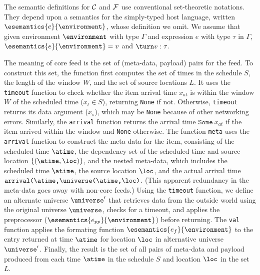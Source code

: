 
The semantic definitions for ${\cal C}$ and ${\cal F}$ use
conventional set-theoretic notations.  They depend upon a
semantics for the simply-typed host language, written
$\esemantics{e}{\environment}$, whose definition we omit. We assume
that given environment $\environment$ with type $\Gamma$ and
expression $e$ with type $\tau$ in $\Gamma$,
$\esemantics{e}{\environment} = v$ and $\turn v : \tau$.

The meaning of core feed \corefeed{} is the set of
(meta-data, payload) pairs for the feed.  To construct this set, the
function first computes the set of times in the schedule $S$, the
length of the window $W$, and the set of source locations $L$.  It
uses the \texttt{timeout} function to check whether the item arrival time
$x_{at}$ is within the window $W$
of the scheduled time ($x_t \in S$), returning \texttt{None} if
not. Otherwise, \texttt{timeout} returns its data argument ($x_s$),
which may be {\tt None} because of other networking errors.  
Similarly, the \texttt{arrival} function returns the arrival time
$\texttt{Some}\ x_{at}$ if the item arrived within the window and 
\texttt{None} otherwise. The function \texttt{meta} uses the 
\texttt{arrival} function to construct the meta-data for the item,
consisting of the scheduled time $\atime$, the dependency set of the scheduled
time and  source location $\{(\atime, \loc)\}$, and the nested
meta-data, which includes the scheduled 
time $\atime$, the source location $\loc$, and the actual arrival time
$\texttt{arrival(\atime,\universe(\atime,\loc)}$. (This apparent
redundancy in the meta-data goes away with non-core feeds.) 
Using the
\texttt{timeout} function, we define an alternate universe
$\universe'$ that retrieves data from the outside world using the
original universe $\universe$, checks for a
timeout, and applies the preprocessor
($\esemantics{e_{pp}}{\environment}$) before returning.  
The \texttt{val} function applies the formating function 
$\esemantics{e_{f}}{\environment}$ to the entry returned at time
$\atime$ for location $\loc$ in alternative universe $\universe'$.
Finally, the result is the set of all pairs of meta-data and payload
produced from each time $\atime$ in the schedule $S$ and location $\loc$
in the set $L$.

